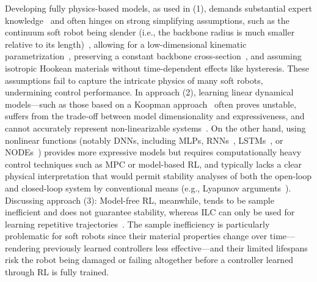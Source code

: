 Developing fully physics-based models, as used in (1), demands substantial expert knowledge~\citep{stella2023science} and often hinges on strong simplifying assumptions, such as the continuum soft robot being slender (i.e., the backbone radius is much smaller relative to its length)~\citep{cosserat1909theorie}, allowing for a low-dimensional kinematic parametrization~\citep{armanini2023soft}, preserving a constant backbone cross-section~\citep{gazzola2018forward}, and assuming isotropic Hookean materials without time-dependent effects like hysteresis. These assumptions fail to capture the intricate physics of many soft robots, undermining control performance. In approach (2), learning linear dynamical models—such as those based on a Koopman approach~\citep{bruder2020data, bruder2024koopman} often proves unstable, suffers from the trade-off between model dimensionality and expressiveness, and cannot accurately represent non-linearizable systems~\citep{cenedese2022data}. On the other hand, using nonlinear functions (notably \glspl{DNN}, including \glspl{MLP}, \glspl{RNN}~\citep{thuruthel2018model, sun2022physics}, \glspl{LSTM}~\citep{xie2023dynamic}, or \glspl{NODE}~\citep{kasaei2023data}) provides more expressive models but requires computationally heavy control techniques such as \gls{MPC} or model-based \gls{RL}, and typically lacks a clear physical interpretation that would permit stability analyses of both the open-loop and closed-loop system by conventional means (e.g., Lyapunov arguments~\citep{khalil2002nonlinear}). Discussing approach (3): Model-free \gls{RL}, meanwhile, tends to be sample inefficient and does not guarantee stability, whereas \gls{ILC} can only be used for learning repetitive trajectories~\citep{bristow2006survey}. The sample inefficiency is particularly problematic for soft robots since their material properties change over time—rendering previously learned controllers less effective—and their limited lifespans~\citep{yasa2023overview} risk the robot being damaged or failing altogether before a controller learned through \gls{RL} is fully trained.

